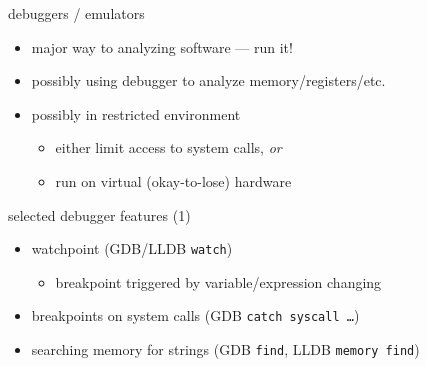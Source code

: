 \begin{frame}{debuggers / emulators}
    \begin{itemize}
    \item major way to analyzing software --- run it!
    \vspace{.5cm}
    \item possibly using debugger to analyze memory/registers/etc.
    \item possibly in restricted environment
        \begin{itemize}
        \item either limit access to system calls, \textit{or}
        \item run on virtual (okay-to-lose) hardware
        \end{itemize}
    \end{itemize}
\end{frame}

\begin{frame}{selected debugger features (1)}
    \begin{itemize}
    \item watchpoint (GDB/LLDB \texttt{watch})
        \begin{itemize}
        \item breakpoint triggered by variable/expression changing
        \end{itemize}
    \item breakpoints on system calls (GDB \texttt{catch syscall \ldots})
    \item searching memory for strings (GDB \texttt{find}, LLDB \texttt{memory find})
    \end{itemize}
\end{frame}

